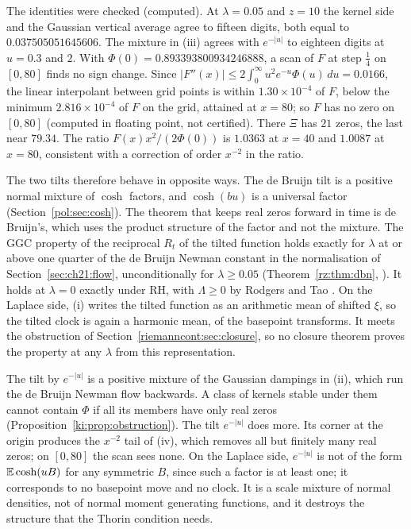 The identities were checked (computed). At $\lambda=0.05$ and $z=10$ the kernel side and the Gaussian vertical average agree to fifteen digits, both equal to $0.037505051645606$. The mixture in (iii) agrees with $e^{-|u|}$ to eighteen digits at $u=0.3$ and $2$. With $\Phi(0)=0.893393800934246888$, a scan of $F$ at step $\frac14$ on $[0,80]$ finds no sign change. Since $|F''(x)|\le2\int_0^\infty u^2e^{-u}\Phi(u)\,du=0.0166$, the linear interpolant between grid points is within $1.30\times10^{-4}$ of $F$, below the minimum $2.816\times10^{-4}$ of $F$ on the grid, attained at $x=80$; so $F$ has no zero on $[0,80]$ (computed in floating point, not certified). There $\Xi$ has $21$ zeros, the last near $79.34$. The ratio $F(x)x^2/(2\Phi(0))$ is $1.0363$ at $x=40$ and $1.0087$ at $x=80$, consistent with a correction of order $x^{-2}$ in the ratio.

The two tilts therefore behave in opposite ways. The de Bruijn tilt is a positive normal mixture of $\cosh$ factors, and $\cosh(bu)$ is a universal factor (Section~\ref{pol:sec:cosh}). The theorem that keeps real zeros forward in time is de Bruijn's, which uses the product structure of the factor and not the mixture. The GGC property of the reciprocal $R_t$ of the tilted function holds exactly for $\lambda$ at or above one quarter of the de Bruijn Newman constant in the normalisation of Section~\ref{sec:ch21:flow}, unconditionally for $\lambda\ge0.05$ (Theorem~\ref{rz:thm:dbn}, \cite{PT21}). It holds at $\lambda=0$ exactly under RH, with $\Lambda\ge0$ by Rodgers and Tao \cite{RodgersTao}. On the Laplace side, (i) writes the tilted function as an arithmetic mean of shifted $\xi$, so the tilted clock is again a harmonic mean, of the basepoint transforms. It meets the obstruction of Section~\ref{riemanncont:sec:closure}, so no closure theorem proves the property at any $\lambda$ from this representation.

The tilt by $e^{-|u|}$ is a positive mixture of the Gaussian dampings in (ii), which run the de Bruijn Newman flow backwards. A class of kernels stable under them cannot contain $\Phi$ if all its members have only real zeros (Proposition~\ref{ki:prop:obstruction}). The tilt $e^{-|u|}$ does more. Its corner at the origin produces the $x^{-2}$ tail of (iv), which removes all but finitely many real zeros; on $[0,80]$ the scan sees none. On the Laplace side, $e^{-|u|}$ is not of the form $\mathbb{E}\cosh(uB)$ for any symmetric $B$, since such a factor is at least one; it corresponds to no basepoint move and no clock. It is a scale mixture of normal densities, not of normal moment generating functions, and it destroys the structure that the Thorin condition needs.

